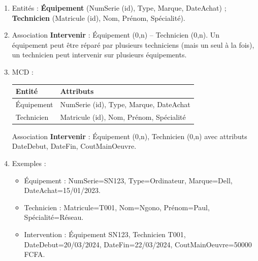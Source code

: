 \begin{enumerate}
    \item Entités : \textbf{Équipement} (NumSerie (id), Type, Marque, DateAchat) ; \textbf{Technicien} (Matricule (id), Nom, Prénom, Spécialité).
    \item Association \textbf{Intervenir} : Équipement (0,n) -- Technicien (0,n). Un équipement peut être réparé par plusieurs techniciens (mais un seul à la fois), un technicien peut intervenir sur plusieurs équipements.
    \item MCD :
    \begin{center}
    \begin{tabular}{|l|l|}
    \hline
    \textbf{Entité} & \textbf{Attributs} \\
    \hline
    Équipement & NumSerie (id), Type, Marque, DateAchat \\
    \hline
    Technicien & Matricule (id), Nom, Prénom, Spécialité \\
    \hline
    \end{tabular}
    \end{center}
    Association \textbf{Intervenir} : Équipement (0,n), Technicien (0,n) avec attributs DateDebut, DateFin, CoutMainOeuvre.
    \item Exemples :
    \begin{itemize}
        \item Équipement : NumSerie=SN123, Type=Ordinateur, Marque=Dell, DateAchat=15/01/2023.
        \item Technicien : Matricule=T001, Nom=Ngono, Prénom=Paul, Spécialité=Réseau.
        \item Intervention : Équipement SN123, Technicien T001, DateDebut=20/03/2024, DateFin=22/03/2024, CoutMainOeuvre=50000 FCFA.
    \end{itemize}
\end{enumerate}

